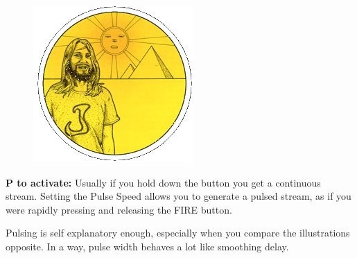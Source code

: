 \begin{definition}
\setlength{\intextsep}{0pt}%
\setlength{\columnsep}{3pt}%
\begin{figure}
\includegraphics[width=\linewidth]{src/callout/psych.png} 
\end{figure}
\small
\textbf{P to activate:} Usually if you hold down the button
you get a continuous stream. Setting the Pulse Speed allows you to
generate a pulsed stream, as if you were rapidly pressing and
releasing the FIRE button.
\\
\end{definition}

Pulsing is self explanatory enough, especially when you compare the
illustrations opposite. In a way, pulse width behaves a lot like smoothing
delay.


